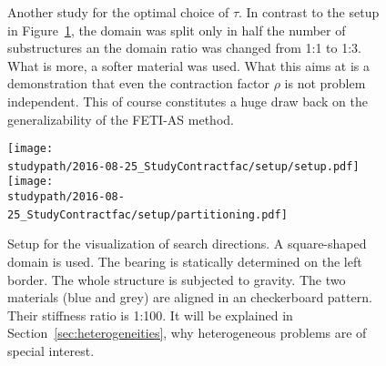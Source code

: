 \begin{figure}[ht]
  \begin{center}
    
    \caption[Choice of $\tau$ - problem 2]{Another study for the optimal choice of $\tau$. In contrast to the setup in Figure~\ref{fig:results_study_contractfac_setup2}, the domain was split only in half the number of substructures an the domain ratio was changed from 1:1 to 1:3. What is more, a softer material was used. What this aims at is a demonstration that even the contraction factor $\rho$ is not problem independent. This of course constitutes a huge draw back on the generalizability of the FETI-AS method.}
    \label{fig:results_study_contractfac_setup2}
  \end{center}
\end{figure}


\begin{figure}[ht]
  \begin{center}
    \texttt{[image: \\studypath/2016-08-25\_StudyContractfac/setup/setup.pdf]}~\hspace{1cm}
    \texttt{[image: \\studypath/2016-08-25\_StudyContractfac/setup/partitioning.pdf]}~
    \caption[Setup for visualization of search directions in FETI-S]{Setup for the visualization of search directions. A square-shaped domain is used. The bearing is statically determined on the left border. The whole structure is subjected to gravity. The two materials (blue and grey) are aligned in an checkerboard pattern. Their stiffness ratio is 1:100. It will be explained in Section~\ref{sec:heterogeneities}, why heterogeneous problems are of special interest.}
    \label{fig:setup_visualization_searchdirs}
  \end{center}
\end{figure}



